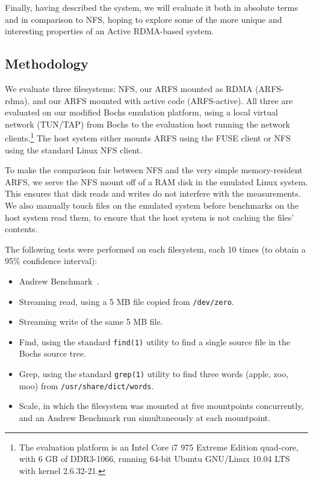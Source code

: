 \documentclass[10pt]{article}
\begin{document}
Finally, having described the system, we will evaluate it both in
absolute terms and in comparison to NFS, hoping to explore some of the
more unique and interesting properties of an Active RDMA-based system.

\subsection{Methodology}

We evaluate three filesystems: NFS, our ARFS mounted as RDMA
(ARFS-rdma), and our ARFS mounted with active code (ARFS-active). All
three are evaluated on our modified Bochs emulation platform, using a
local virtual network (TUN/TAP) from Bochs to the evaluation host
running the network clients.\footnote{The evaluation platform is an
  Intel Core i7 975 Extreme Edition quad-core, with 6 GB of DDR3-1066,
  running 64-bit Ubuntu GNU/Linux 10.04 LTS with kernel 2.6.32-21.}
The host system either mounts ARFS using the FUSE client or NFS using
the standard Linux NFS client.

To make the comparison fair between NFS and the very simple
memory-resident ARFS, we serve the NFS mount off of a RAM disk in the
emulated Linux system. This ensures that disk reads and writes do not
interfere with the measurements. We also manually touch files on the
emulated system before benchmarks on the host system read them, to
ensure that the host system is not caching the files' contents.

The following tests were performed on each filesystem, each 10 times
(to obtain a 95\% confidence interval):

\begin{itemize}
\item Andrew Benchmark~\cite{ab}.
\item Streaming read, using a 5 MB file copied from {\tt /dev/zero}.
\item Streaming write of the same 5 MB file.
\item Find, using the standard {\tt find(1)} utility to find a single source file in the Bochs source tree.
\item Grep, using the standard {\tt grep(1)} utility to find three
  words (apple, zoo, moo) from {\tt /usr/share/dict/words}.
\item Scale, in which the filesystem was mounted at five mountpoints
  concurrently, and an Andrew Benchmark run simultaneously at each
  mountpoint.
\end{itemize}
\end{document}
